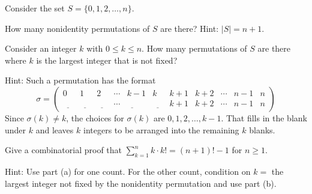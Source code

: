 \begin{exer}[\exerE] %
\label{exer_comb_pf_factorials}
    Consider the set $S = \{0, 1, 2, \ldots, n\}$.
    \begin{exerpart}
        \item \label{part_counting_nonid_perms} How many nonidentity permutations of $S$ are there?  Hint: $|S|=n+1$.
        \item \label{part_counting_perms_that_fix_afterk} Consider an integer $k$ with $0 \le k \le n$.  How many permutations of $S$ are there where $k$ is the largest integer that is not fixed?  
        
        Hint: Such a permutation has the format
            $$\sigma = \left(\begin{array} {ccccccccccc}  
            0 & 1 & 2 & \cdots & k-1 & k & k+1 & k+2 & \cdots & n-1 & n\\
            \underline{~\quad} & \underline{~\quad} & \underline{~\quad} & \cdots &  \underline{~\quad} & \underline{~\quad}
            & k+1 & k+2 &  \cdots & n-1 & n  \end{array}\right)$$
        Since $\sigma(k) \neq k$, the choices for $\sigma(k)$ are $0, 1, 2, \ldots, k-1$.  That fills in the blank under $k$ and leaves $k$ integers to be arranged into the remaining $k$ blanks.
        \item Give a combinatorial proof that $\displaystyle \sum_{k=1}^nk\cdot k! = (n+1)!-1$ for $n \ge 1$. 
        
        Hint:  Use part (a) for one count.  For the other count, condition on $k=$ the largest integer not fixed by the nonidentity permutation and use part (b).
    \end{exerpart}
\end{exer}

